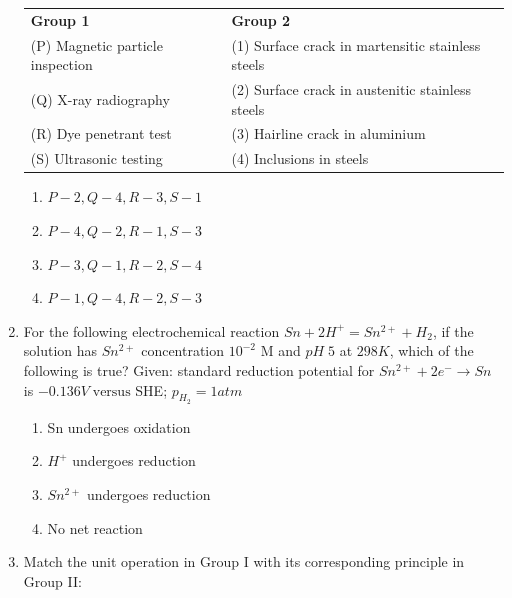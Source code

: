 \documentclass[journal]{IEEEtran}
\theoremstyle{remark}
\begin{document}
\begin{enumerate}
\begin{center}
\begin{tabular}{ll}
\textbf{Group 1} & \textbf{Group 2} \\
 (P) Magnetic particle inspection      &  (1) Surface crack in martensitic stainless steels  \\
  (Q) X-ray radiography    & (2) Surface crack in austenitic stainless steels \\
 (R) Dye penetrant test & (3) Hairline crack in aluminium \\
 (S) Ultrasonic testing  & (4) Inclusions in steels \\
\end{tabular}
\end{center}
\begin{multicols}{2}
\begin{enumerate}
\item  $P-2, Q-4, R-3, S-1$
\item  $P-4, Q-2, R-1, S-3$ 
\item  $P-3, Q-1, R-2, S-4$
\item   $P-1, Q-4, R-2, S-3$ 
\end{enumerate}
\end{multicols}

\item For the following electrochemical reaction $Sn + 2H^+
 = Sn^{2+} + H_2$, if the solution has $Sn^{2+}$ concentration $10^{-2}$ M and $pH \;5$ at $298 K$, which of the following is true?
Given: standard reduction potential for $Sn^{2+} + 2e^- \longrightarrow Sn$ is $-0.136 V\; \text{versus}$ SHE; $p_{H_2} = 1 atm$\hfill{}


\begin{multicols}{2}

\begin{enumerate}
\item   Sn undergoes oxidation
\item  $H^+$ undergoes reduction
\item   $Sn^{2+}$ undergoes reduction
\item  No net reaction
\end{enumerate}
\end{multicols}
\item Match the unit operation in Group I with its corresponding principle in Group II: \hfill{}\\
\begin{center}
    


\end{center}
\end{enumerate}
\end{document}
